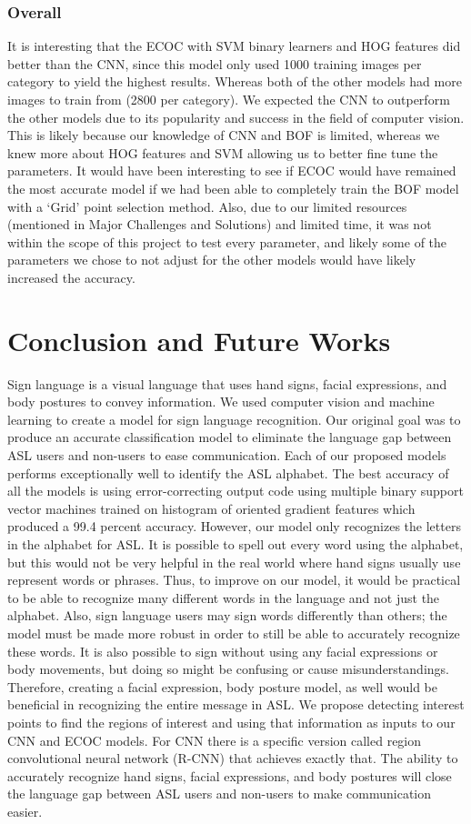 \documentclass[conference]{IEEEtran}
\begin{document}
\subsubsection{Overall}
It is interesting that the ECOC with SVM binary learners and HOG features did better than the CNN, since this model only used 1000 training images per category to yield the highest results. Whereas both of the other models had more images to train from (2800 per category). We expected the CNN to outperform the other models due to its popularity and success in the field of computer vision. This is likely because our knowledge of CNN and BOF is limited, whereas we knew more about HOG features and SVM allowing us to better fine tune the parameters. It would have been interesting to see if ECOC would have remained the most accurate model if we had been able to completely train the BOF model with a ‘Grid’ point selection method. Also, due to our limited resources (mentioned in Major Challenges and Solutions) and limited time, it was not within the scope of this project to test every parameter, and likely some of the parameters we chose to not adjust for the other models would have likely increased the accuracy. 
\section{Conclusion and Future Works}
Sign language is a visual language that uses hand signs, facial expressions, and body postures to convey information. We used computer vision and machine learning to create a model for sign language recognition. Our original goal was to produce an accurate classification model to eliminate the language gap between ASL users and non-users to ease communication. Each of our proposed models performs exceptionally well to identify the ASL alphabet. The best accuracy of all the models is using error-correcting output code using multiple binary support vector machines trained on histogram of oriented gradient features which produced a 99.4 percent accuracy. However, our model only recognizes the letters in the alphabet for ASL. It is possible to spell out every word using the alphabet, but this would not be very helpful in the real world where hand signs usually use represent words or phrases. Thus, to improve on our model, it would be practical to be able to recognize many different words in the language and not just the alphabet. Also, sign language users may sign words differently than others; the model must be made more robust in order to still be able to accurately recognize these words. It is also possible to sign without using any facial expressions or body movements, but doing so might be confusing or cause misunderstandings. Therefore, creating a facial expression, body posture model, as well would be beneficial in recognizing the entire message in ASL. We propose detecting interest points to find the regions of interest and using that information as inputs to our CNN and ECOC models. For CNN there is a specific version called region convolutional neural network (R-CNN) that achieves exactly that. The ability to accurately recognize hand signs, facial expressions, and body postures will close the language gap between ASL users and non-users to make communication easier.
\end{document}
